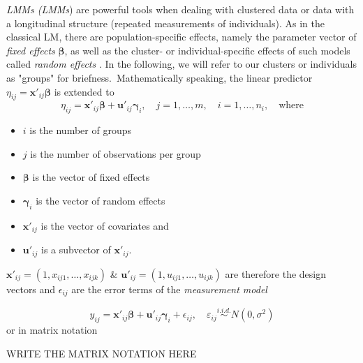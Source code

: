 \textit{\acl{LMM}s (\acs{LMM}s}) are powerful tools when dealing with clustered data or data with a longitudinal structure (repeated measurements of individuals).
As in the classical \acs{LM}, there are population-specific effects, namely the parameter vector of \textit{fixed effects} $\boldsymbol{\beta}$, as well as the cluster- or individual-specific effects of such models called \textit{random effects} \cite{fahrmeir2003regression}. In the following, we will refer to our clusters or individuals as "groups" for briefness.\ Mathematically speaking, the linear predictor $\eta_{ij}= \mathbf{x}'_{ij} \mathbf{\beta} $ is extended to
$$\eta_{ij} = \mathbf{{x'}}_{ij} \mathbf{\beta} + \mathbf{u'}_{ij}\mathbf{\gamma}_i, \quad j=1, \ldots, m, \quad i=1, \ldots, n_i, \quad \text{where}$$
\begin{itemize}
\item $i$ is the number of groups
\item $j$ is the number of observations per group
\item $\bm{\beta}$ is the vector of fixed effects
\item $\bm{\gamma}_i$ is the vector of random effects
\item $\mathbf{x'}_{ij}$ is the vector of covariates and
\item $\mathbf{u'}_{ij}$ is a subvector of $\mathbf{x'}_{ij}$.
\end{itemize}
$\mathbf{x'}_{ij} = (1, x_{ij1}, \ldots, x_{ijk}) $ \& $ \mathbf{u'}_{ij} = (1, u_{ij1}, \ldots, u_{ijk}) $ are therefore the design vectors and $\epsilon_{ij}$ are the error terms of the \textit{measurement model}

\begin{equation}
y_{ij} =  \mathbf{x'}_{ij} \mathbf{\beta} + \mathbf{u'}_{ij} \mathbf{\gamma}_i + \epsilon_{ij}, \quad \varepsilon_{i j} \overset{i.i.d.} \sim N\left(0, \sigma^{2}\right) 
\end{equation}
or in matrix notation

WRITE THE MATRIX NOTATION HERE


